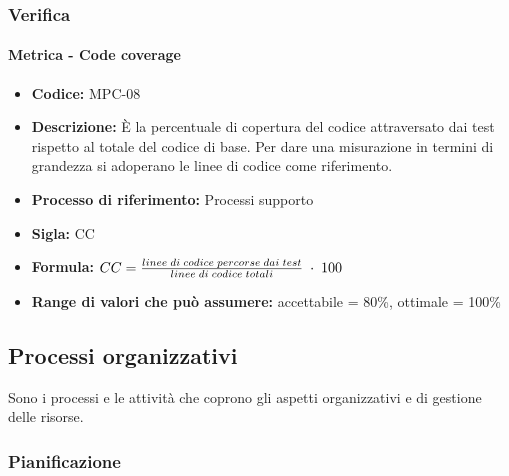 \subsubsection{Verifica}
    \paragraph{Metrica - Code coverage}
    \begin{itemize}
        \item \textbf{Codice:} MPC-08
        \item \textbf{Descrizione:} È la percentuale di copertura del codice attraversato dai test rispetto al totale del codice di base. Per dare una misurazione in termini di grandezza si adoperano le linee di codice come riferimento.
        \item \textbf{Processo di riferimento:} Processi supporto
        \item \textbf{Sigla:} CC
        \item \textbf{Formula:} \begin{math}{CC = {linee \; di \; codice \; percorse \; dai  \; test \over linee \; di \; codice \; totali} \; \cdot \; 100}\end{math}
        \item \textbf{Range di valori che può assumere:} accettabile = 80\%, ottimale = 100\%
    \end{itemize}

\subsection{Processi organizzativi}
Sono i processi e le attività che coprono gli aspetti organizzativi e di gestione delle risorse.

\subsubsection{Pianificazione}
